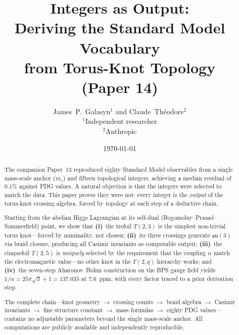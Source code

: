 \documentclass[11pt]{article}
\newcommand{\su}{\mathfrak{su}}
\begin{document}
\title{Integers as Output:\\[4pt]
Deriving the Standard Model Vocabulary\\
from Torus-Knot Topology\\[2pt]
\normalsize (Paper 14)}

\author{
  James~P.~Galasyn$^{1}$ \quad and \quad Claude~Th\'eodore$^{2}$\\[2pt]
  \small $^1$Independent researcher \\
  \small $^2$Anthropic
}

\date{\today}

\maketitle

\begin{abstract}
The companion Paper~13 reproduced eighty Standard Model observables
from a single mass-scale anchor ($m_e$) and fifteen topological
integers, achieving a median residual of $0.1\%$ against PDG values.
A natural objection is that the integers were selected to match the
data.  This paper proves they were not: every integer is the
\emph{output} of the torus-knot crossing algebra, forced by
topology at each step of a deductive chain.

Starting from the abelian Higgs Lagrangian at its self-dual
(Bogomolny--Prasad--Sommerfield) point, we show that
\textbf{(i)}~the trefoil $T(2,3)$ is the simplest non-trivial
torus knot---forced by minimality, not chosen;
\textbf{(ii)}~its three crossings generate $\su(3)$ via braid
closure, producing all Casimir invariants as computable output;
\textbf{(iii)}~the cinquefoil $T(2,5)$ is \emph{uniquely} selected
by the requirement that the coupling $\alpha$ match the
electromagnetic value---no other knot in the $T(2,q)$ hierarchy
works; and
\textbf{(iv)}~the seven-step Aharonov--Bohm construction on the
BPS gauge field yields $1/\alpha = 25\pi\sqrt{3}+1 = 137.035$ at
$7.6$~ppm, with every factor traced to a prior derivation step.

The complete chain---knot geometry $\to$ crossing counts $\to$
braid algebra $\to$ Casimir invariants $\to$ fine structure
constant $\to$ mass formulas $\to$ eighty PDG values---contains
no adjustable parameters beyond the single mass-scale anchor.
All computations are publicly available and independently
reproducible.
\end{abstract}

\tableofcontents
\end{document}
